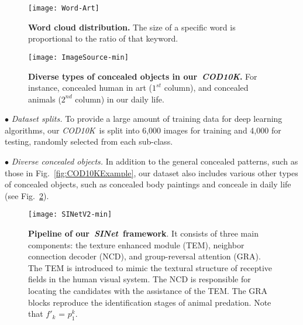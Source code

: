 \documentclass[10pt,journal,compsoc]{IEEEtran}
\newcommand{\figref}[1]{Fig.~\ref{#1}}
\def\ourdataset{\textit{COD10K}}
\def\ournewmodel{\emph{SINet}}
\begin{document}
\begin{figure}[t!]
  \centering
  \texttt{[image: Word-Art]}\\
  \vspace{-15pt}
  \caption{\textbf{Word cloud distribution.}
	The size of a specific word is proportional to the ratio 
	of that keyword.
  }\label{fig:Wordcloud}
\end{figure}

\begin{figure}[t!]
  \centering
  \texttt{[image: ImageSource-min]}\\
  \vspace{-10pt}
  \caption{\textbf{Diverse types of concealed objects in our~\ourdataset.} 
	For instance, concealed human in art ($1^{st}$ column), and 
    concealed animals ($2^{nd}$ column) in our daily life.
  }\label{fig:DiverseType}
\end{figure}

$\bullet$ \emph{Dataset splits.}
To provide a large amount of training data for deep learning algorithms, 
our \ourdataset~is split into 6,000 images for training and 4,000 for testing, 
randomly selected from each sub-class.

$\bullet$ \emph{Diverse concealed objects.}
In addition to the general concealed patterns, such as those in
\figref{fig:COD10KExample}, our dataset also includes various 
other types of concealed objects, such as
concealed body paintings and conceale in daily life 
(see \figref{fig:DiverseType}).


\begin{figure*}[t!]
  \centering
  \texttt{[image: SINetV2-min]}\\
  \vspace{-12pt}
  \caption{\textbf{Pipeline of our~\ournewmodel~framework}. 
    It consists of three main components: the texture enhanced module (TEM), 
    neighbor connection decoder (NCD), and group-reversal attention (GRA).
    The TEM is introduced to mimic the textural structure of receptive fields 
    in the human visual system.
    The NCD is responsible for locating the candidates with the assistance 
    of the TEM.
    The GRA blocks reproduce the identification stages of animal predation. 
    Note that $f'_k$ = $p_1^k$.
  }\label{fig:Framework}
\end{figure*}
\end{document}
